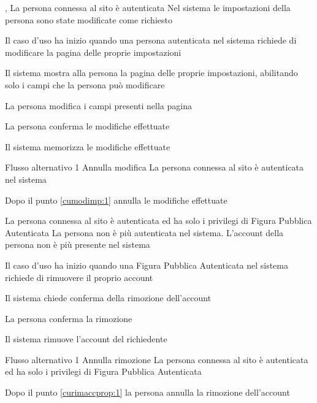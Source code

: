 {, }
{La persona connessa al sito è autenticata}
{Nel sistema le impostazioni della persona sono state modificate come richiesto}   
{\begin{enumCU}
	\item Il caso d'uso ha inizio quando una persona autenticata nel sistema richiede di modificare la pagina delle proprie impostazioni
	\item Il sistema mostra alla persona la pagina delle proprie impostazioni, abilitando solo i campi che la persona può modificare
	\item La persona modifica i campi presenti nella pagina\label{cumodimp:1}
	\item La persona conferma le modifiche effettuate 
	\item Il sistema memorizza le modifiche effettuate
\end{enumCU}}
%
{Flusso alternativo 1}%
{Annulla modifica}%
{La persona connessa al sito è autenticata  nel sistema}%
{\postNulle}%
{\begin{enumCU}
		\item Dopo il punto \ref{cumodimp:1} annulla le modifiche effettuate
	\end{enumCU}}%


{}
{La persona connessa al sito è autenticata ed ha solo i privilegi di Figura Pubblica Autenticata}
{La persona non è più autenticata nel sistema. L'account della persona non è più presente nel sistema}
{\begin{enumCU}
	\item Il caso d'uso ha inizio quando una Figura Pubblica Autenticata nel sistema richiede di rimuovere il proprio account
	\item Il sistema chiede conferma della rimozione dell'account\label{curimaccprop:1}
	\item La persona conferma la rimozione
	\item Il sistema rimuove l'account del richiedente
\end{enumCU}}
%
{Flusso alternativo 1}%
{Annulla rimozione}%
{La persona connessa al sito è autenticata ed ha solo i privilegi di Figura Pubblica Autenticata}%
{\postNulle}%
{\begin{enumCU}
		\item Dopo il punto \ref{curimaccprop:1} la persona annulla la rimozione dell'account
	\end{enumCU}}%

